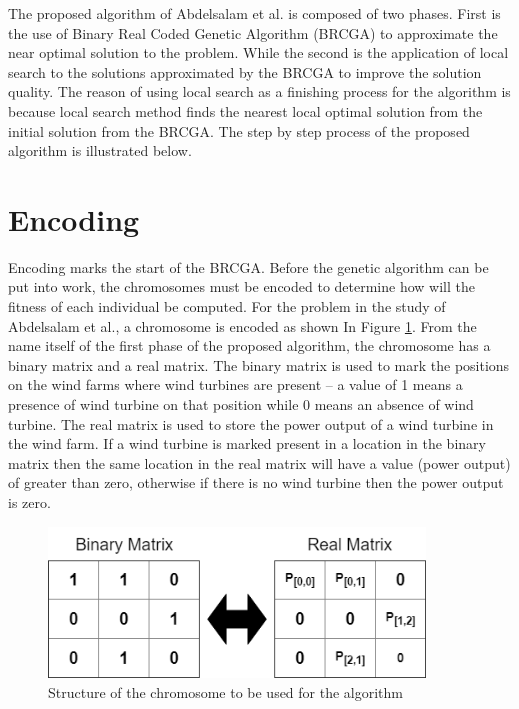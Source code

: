     The proposed algorithm of Abdelsalam et al. \cite{this} is composed of two phases. First is the use of Binary Real Coded Genetic Algorithm (BRCGA) to approximate the near optimal solution to the problem. While the second is the application of local search to the solutions approximated by the BRCGA to improve the solution quality. The reason of using local search as a finishing process for the algorithm is because local search method finds the nearest local optimal solution from the initial solution from the BRCGA. The step by step process of the proposed algorithm is illustrated below.
            
        \section{Encoding}
            \par Encoding marks the start of the BRCGA. Before the genetic algorithm can be put into work, the chromosomes must be encoded to determine how will the fitness of each individual be computed. For the problem in the study of Abdelsalam et al., a chromosome is encoded as shown In Figure \ref{encoding}. From the name itself of the first phase of the proposed algorithm, the chromosome has a binary matrix and a real matrix. The binary matrix is used to mark the positions on the wind farms where wind turbines are present – a value of 1 means a presence of wind turbine on that position while 0 means an absence of wind turbine. The real matrix is used to store the power output of a wind turbine in the wind farm. If a wind turbine is marked present in a location in the binary matrix then the same location in the real matrix will have a value (power output) of greater than zero, otherwise if there is no wind turbine then the power output is zero.
                    
            \begin{figure}[h]
                \centering
                \includegraphics[width=100mm]{Figures/encoding.png}
                \caption{Structure of the chromosome to be used for the algorithm}
                \label{encoding}
            \end{figure}
            
